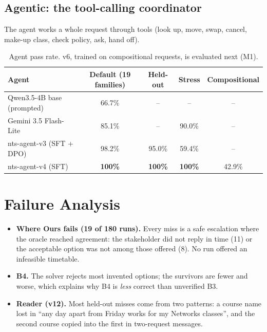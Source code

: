 \documentclass[11pt,a4paper]{article}
\newcommand{\best}[1]{\textbf{#1}}
\begin{document}
\subsection{Agentic: the tool-calling coordinator}
\label{sec:agent}
The agent works a whole request through tools (look up, move, swap, cancel, make-up
class, check policy, ask, hand off).
\begin{table}[H]
\centering\small
\begin{tabularx}{\textwidth}{@{}l C C C C@{}}
\toprule
\textbf{Agent} & \textbf{Default (19 families)} & \textbf{Held-out} & \textbf{Stress} & \textbf{Compositional}\\
\midrule
Qwen3.5-4B base (prompted) & 66.7\% & -- & -- & --\\
Gemini 3.5 Flash-Lite & 85.1\% & -- & 90.0\% & --\\
nts-agent-v3 (SFT + DPO) & 98.2\% & 95.0\% & 59.4\% & --\\
nts-agent-v4 (SFT) & \best{100\%} & \best{100\%} & \best{100\%} & 42.9\%\\
\bottomrule
\end{tabularx}
\caption{Agent pass rate. v6, trained on compositional requests, is evaluated next (M1).}
\end{table}

\section{Failure Analysis}
\begin{itemize}
\item \textbf{Where Ours fails (19 of 180 runs).} Every miss is a safe escalation where
the oracle reached agreement: the stakeholder did not reply in time (11) or the acceptable
option was not among those offered (8). No run offered an infeasible timetable.
\item \textbf{B4.} The solver rejects most invented options; the survivors are fewer and
worse, which explains why B4 is \emph{less} correct than unverified B3.
\item \textbf{Reader (v12).} Most held-out misses come from two patterns: a course name
lost in ``any day apart from Friday works for my Networks classes'', and the second
course copied into the first in two-request messages.
\end{itemize}

\end{document}
